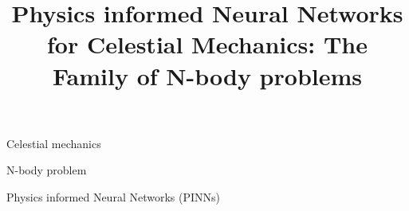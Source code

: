 \documentclass[draft]{agujournal2019}
\begin{document}
\title{Physics informed Neural Networks for Celestial Mechanics: The Family of N-body problems}

%
%












\begin{keypoints}
\item Celestial mechanics
\item N-body problem
\item Physics informed Neural Networks (PINNs)
\end{keypoints}
\end{document}
